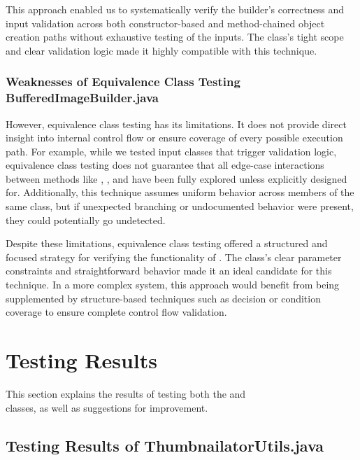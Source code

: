 \documentclass[12pt]{article}
\begin{document}
    This approach enabled us to systematically verify the builder's correctness
        and input validation across both constructor-based and method-chained
        object creation paths without exhaustive testing of the inputs.
    The class's tight scope and clear validation logic made it highly compatible
        with this technique.

    \markboth{}{}
    \subsubsection{Weaknesses of Equivalence Class Testing BufferedImageBuilder.java}
    \markboth{}{}

    However, equivalence class testing has its limitations.
    It does not provide direct insight into internal control flow or ensure
        coverage of every possible execution path.
    For example, while we tested input classes that trigger validation logic,
        equivalence class testing does not guarantee that all edge-case
        interactions between methods like , , and
         have been fully explored unless explicitly designed
        for.
    Additionally, this technique assumes uniform behavior across members of the
        same class, but if unexpected branching or undocumented behavior were
        present, they could potentially go undetected.

    Despite these limitations, equivalence class testing offered a structured
        and focused strategy for verifying the functionality of
        .
    The class's clear parameter constraints and straightforward behavior made it
        an ideal candidate for this technique.
    In a more complex system, this approach would benefit from being
        supplemented by structure-based techniques such as decision or condition
        coverage to ensure complete control flow validation.

    \markboth{}{}
    \section{Testing Results}
    \markboth{}{}

    This section explains the results of testing both the
         and\\
        classes, as well as suggestions for improvement.

    \markboth{}{}
    \subsection{Testing Results of ThumbnailatorUtils.java}
    \markboth{}{}
\end{document}
